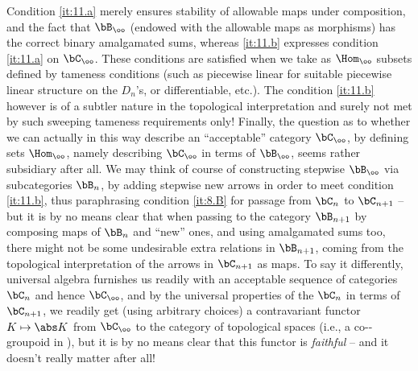 Condition \ref{it:11.a} merely ensures stability of allowable maps
under composition, and the fact that $\bB_\oo$ (endowed with the
allowable maps as morphisms) has the correct binary amalgamated sums,
whereas \ref{it:11.b} expresses condition \ref{it:11.a} on $\bC_\oo$.
These conditions are satisfied when we take as $\Hom_\oo$
subsets defined by tameness conditions (such as piecewise linear for
suitable piecewise linear structure on the $D_n$'s, or differentiable,
etc.). The condition \ref{it:11.b} however is of a subtler nature in
the topological interpretation and surely not met by such sweeping
tameness requirements only! Finally, the question as to whether we can
actually in this way describe an ``acceptable'' category $\bC_\oo$,
by defining sets $\Hom_\oo$, namely describing $\bC_\oo$ in terms
of $\bB_\oo$, seems rather subsidiary after all. We may think of
course of constructing stepwise $\bB_\oo$ via subcategories $\bB_n$,
by adding stepwise new arrows in order to meet condition
\ref{it:11.b}, thus paraphrasing condition \ref{it:8.B} for passage
from $\bC_n$ to $\bC_{n+1}$ -- but it is by no means clear that
when passing to the category $\bB_{n+1}$ by composing maps of $\bB_n$
and ``new'' ones, and using amalgamated sums too, there might not
be some undesirable extra relations in $\bB_{n+1}$, coming from the
topological interpretation of the arrows in $\bC_{n+1}$ as maps. To
say it differently, universal algebra furnishes us readily with an
acceptable sequence of categories $\bC_n$ and hence $\bC_\oo$,
and by the universal properties of the $\bC_n$ in terms of
$\bC_{n+1}$, we readily get (using arbitrary choices) a contravariant
functor $K \mapsto \abs K$ from $\bC_\oo$ to the category of
topological spaces (i.e., a co-\oo-groupoid in \cTop), but it is by no
means clear that this functor is \emph{faithful} -- and it doesn't really
matter after all!

